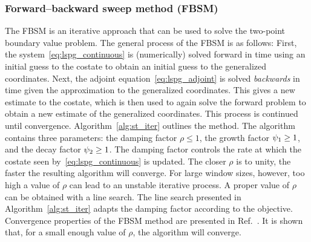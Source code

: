 \subsubsection{Forward--backward sweep method (FBSM)}\label{sec:FBSM}


The FBSM is an iterative approach that can be used to
solve the two-point boundary value problem. The general process of the FBSM is
as follows: First, the system~\eqref{eq:lspg_continuous} is (numerically) solved forward in
time using an initial guess to the costate to obtain an initial guess to
the generalized coordinates. Next, the adjoint equation~\eqref{eq:lspg_adjoint} is solved \textit{backwards} in time given the
approximation to the generalized coordinates. This gives a new estimate to the
costate, which is then used to again solve the forward problem to obtain
a new estimate of the generalized coordinates. This process is continued until
convergence. Algorithm~\ref{alg:st_iter} outlines the method. The algorithm
contains three parameters: the damping factor $\rho \le 1$, the growth factor
$\psi_1 \ge 1$, and the decay factor $\psi_2 \ge 1$. The damping factor controls the rate at which the costate seen by~\eqref{eq:lspg_continuous} is updated. The
closer $\rho$ is to unity, the faster the resulting algorithm will converge.
For large window sizes, however, too high a value of $\rho$ can lead to an unstable iterative process. 
A proper value of $\rho$ can be
obtained with a line search. The line search presented in Algorithm~\ref{alg:st_iter} adapts the damping factor
according to the objective. Convergence properties of the FBSM method are
presented in Ref.~\cite{McAsey2012ConvergenceOT}. It is shown that, for a small 
enough value of $\rho$, the algorithm will converge.

